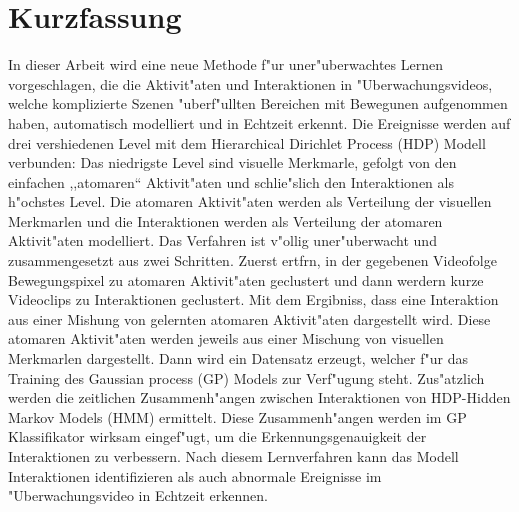 
\chapter*{Kurzfassung}


\label{chap:Kurzfassung}

In dieser Arbeit wird eine neue Methode f"ur uner"uberwachtes Lernen vorgeschlagen, die die Aktivit"aten und Interaktionen in "Uberwachungsvideos, welche komplizierte Szenen  "uberf"ullten Bereichen mit Bewegunen aufgenommen haben, automatisch modelliert und in Echtzeit erkennt.
Die Ereignisse werden auf drei vershiedenen Level mit dem Hierarchical Dirichlet Process (HDP) Modell verbunden: Das niedrigste Level sind visuelle Merkmarle, gefolgt von den einfachen ,,atomaren`` Aktivit"aten und schlie"slich den Interaktionen als h"ochstes Level.
Die atomaren Aktivit"aten werden als Verteilung der visuellen Merkmarlen und die Interaktionen werden als Verteilung der atomaren Aktivit"aten modelliert.
Das Verfahren ist v"ollig uner"uberwacht und zusammengesetzt aus zwei Schritten. 
Zuerst ertfrn, in der gegebenen Videofolge Bewegungspixel zu atomaren Aktivit"aten geclustert und dann werdern kurze Videoclips zu Interaktionen geclustert.
Mit dem Ergibniss, dass eine Interaktion aus einer Mishung von gelernten atomaren Aktivit"aten dargestellt wird. Diese atomaren Aktivit"aten werden jeweils aus einer Mischung von visuellen Merkmarlen dargestellt.
Dann wird ein Datensatz erzeugt, welcher f"ur das Training des Gaussian process (GP) Models zur Verf"ugung steht.
Zus"atzlich werden die zeitlichen Zusammenh"angen zwischen Interaktionen von HDP-Hidden Markov Models (HMM) ermittelt. Diese Zusammenh"angen werden im GP Klassifikator wirksam eingef"ugt, um die Erkennungsgenauigkeit der Interaktionen zu verbessern.
Nach diesem Lernverfahren kann das Modell Interaktionen identifizieren als auch abnormale Ereignisse im "Uberwachungsvideo in Echtzeit erkennen.


